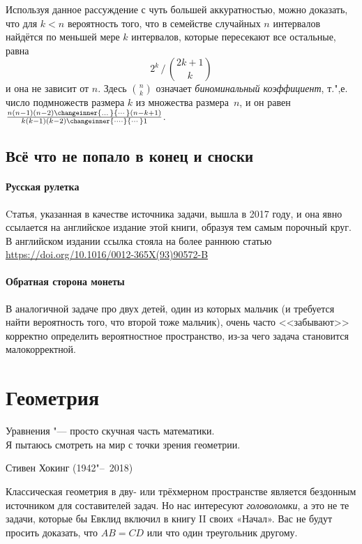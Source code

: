 \documentclass[twoside]{book}
\begin{document}
Используя данное рассуждение с чуть большей аккуратностью, можно доказать, что 
для $k < n$ вероятность того, что в семействе случайных $n$ интервалов найдётся по меньшей мере $k$ интервалов, которые пересекают все остальные, равна
\[{2^k}\,\big/\,{\binom{2k+1} k}\]
и она не зависит от $n$.
Здесь $\binom n k$ означает \emph{биноминальный коэффициент}, т.",е. число подмножеств размера $k$ из множества размера~$n$, и он равен $
\frac{n(n-1)(n-2)\changeinner{\dots}{\cdots}(n-k+1)}{k(k-1)(k-2)\changeinner{\dots\cdot}{\cdots} 1}$.

\section*{Всё что не попало в конец и сноски}

\subsubsection{Русская рулетка}
Cтатья, указанная в качестве источника задачи, вышла в 2017 году, и она явно ссылается на английское издание этой книги, образуя тем самым порочный круг.
В английском издании ссылка стояла на более раннюю статью \url{https://doi.org/10.1016/0012-365X(93)90572-B}


\subsubsection*{Обратная сторона монеты}
В аналогичной задаче про двух детей, один из которых мальчик (и требуется найти вероятность того, что второй тоже мальчик), 
очень часто <<забывают>> корректно определить вероятностное пространство, из-за чего задача становится малокорректной.


\chapter{Геометрия}

\setlength{\epigraphwidth}{.66\textwidth}
\epigraph{Уравнения "--- просто скучная часть математики.\\
Я пытаюсь смотреть на мир с точки зрения геометрии.\vspace{1ex}}{Стивен Хокинг (1942"--~2018)}

Классическая геометрия в дву- или трёхмерном пространстве является бездонным источником для составителей задач. 
Но нас интересуют \emph{головоломки}, а это не те задачи, которые бы Евклид включил в книгу II своих «Начал».
Вас не будут просить доказать, что $AB=CD$ или что один треугольник  другому.
\end{document}
